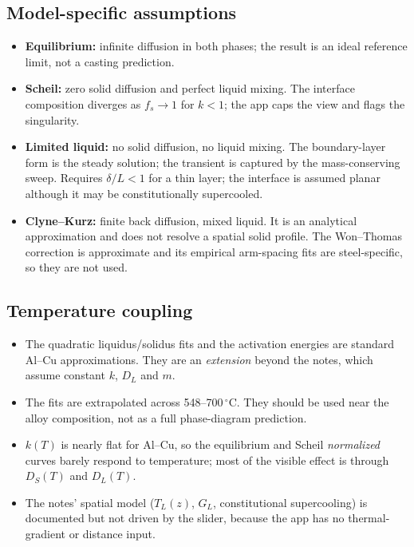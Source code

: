 \documentclass[11pt,a4paper]{article}
\begin{document}
\subsection*{Model-specific assumptions}

\begin{itemize}[leftmargin=1.4em,itemsep=0.18em]
  \item \textbf{Equilibrium:} infinite diffusion in both phases; the result is
        an ideal reference limit, not a casting prediction.
  \item \textbf{Scheil:} zero solid diffusion and perfect liquid mixing. The
        interface composition diverges as $f_s\to1$ for $k<1$; the app caps
        the view and flags the singularity.
  \item \textbf{Limited liquid:} no solid diffusion, no liquid mixing. The
        boundary-layer form is the steady solution; the transient is captured
        by the mass-conserving sweep. Requires $\delta/L<1$ for a thin layer;
        the interface is assumed planar although it may be constitutionally
        supercooled.
  \item \textbf{Clyne--Kurz:} finite back diffusion, mixed liquid. It is an
        analytical approximation and does not resolve a spatial solid profile.
        The Won--Thomas correction is approximate and its empirical
        arm-spacing fits are steel-specific, so they are not used.
\end{itemize}

\subsection*{Temperature coupling}

\begin{itemize}[leftmargin=1.4em,itemsep=0.18em]
  \item The quadratic liquidus/solidus fits and the activation energies are
        standard Al--Cu approximations. They are an \emph{extension} beyond the
        notes, which assume constant $k$, $D_L$ and $m$.
  \item The fits are extrapolated across 548--700\,$^\circ$C. They should be
        used near the alloy composition, not as a full phase-diagram
        prediction.
  \item $k(T)$ is nearly flat for Al--Cu, so the equilibrium and Scheil
        \emph{normalized} curves barely respond to temperature; most of the
        visible effect is through $D_S(T)$ and $D_L(T)$.
  \item The notes' spatial model ($T_L(z)$, $G_L$, constitutional
        supercooling) is documented but not driven by the slider, because the
        app has no thermal-gradient or distance input.
\end{itemize}
\end{document}
